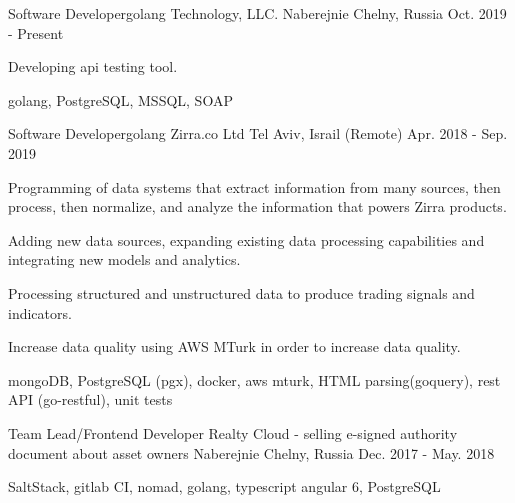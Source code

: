

\begin{cventries}

  \cventry
    {Software Developer{\enskip\cdotp\enskip}golang} %
    {Technology, LLC.} %
    {Naberejnie Chelny, Russia} %
    {Oct. 2019 - Present} %
    {
      \begin{cvitems} %
        \item {Developing api testing tool.}
        \item {golang, PostgreSQL, MSSQL, SOAP}
      \end{cvitems}
    }

  \cventry
    {Software Developer{\enskip\cdotp\enskip}golang} %
    {Zirra.co Ltd} %
    {Tel Aviv, Israil (Remote)} %
    {Apr. 2018 - Sep. 2019} %
    {
      \begin{cvitems} %
        \item {Programming of data systems that extract information from many sources, then process, then normalize, and analyze the information that powers Zirra products.}
        \item {Adding new data sources, expanding existing data processing capabilities and integrating new models and analytics.}
        \item {Processing structured and unstructured data to produce trading signals and indicators.}
        \item {Increase data quality using AWS MTurk in order to increase data quality.}
        \item {mongoDB, PostgreSQL (pgx), docker, aws mturk, HTML parsing(goquery), rest API (go-restful), unit tests}
      \end{cvitems}
    }

  \cventry
    {Team Lead/Frontend Developer} %
    {Realty Cloud - selling e-signed authority document about asset owners} %
    {Naberejnie Chelny, Russia} %
    {Dec. 2017 - May. 2018} %
    {
      \begin{cvitems} %
        \item {SaltStack, gitlab CI, nomad, golang, typescript angular 6, PostgreSQL}
      \end{cvitems}
    }


\end{cventries}
